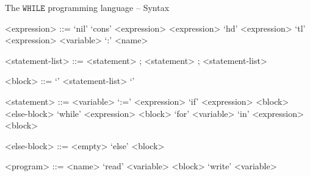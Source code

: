 \documentclass{beamer}
\newcommand*{\WHILE}{\ensuremath{\mathtt{WHILE}}\xspace}
\theoremstyle{definition}
\begin{document}
\begin{frame}[fragile]{The \WHILE programming language -- Syntax}
	\begin{center}
		\begin{tiny}
			\begin{grammar}
				<expression> ::= 
									`nil' 
						\alt 	`cons' <expression> <expression>
						\alt 	`hd' <expression>
						\alt 	`tl' <expression>
						\alt 	<variable>
						\alt 	`:' <name>

				<statement-list> ::= <statement> ;  ; <statement-list>

				<block> ::= `{' <statement-list> `}'

				<statement> ::=
									<variable> `:=' <expression>
						\alt	`if' <expression> <block> <else-block>
						\alt	`while' <expression> <block>
						\alt	`for' <variable> `in' <expression> <block>
					
						<else-block> ::= <empty> \alt `else' <block>
						
						<program> ::= <name> `read' <variable> <block> `write' <variable>
			\end{grammar}
		\end{tiny}
	\end{center}
\end{frame}
\end{document}
